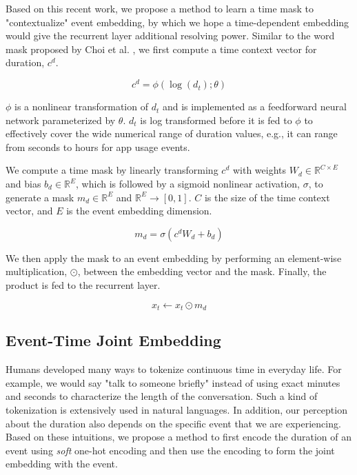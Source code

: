 \documentclass{article} %
\begin{document}
Based on this recent work, we propose a method to learn a time mask to "contextualize" event embedding, by which we hope a time-dependent embedding would give the recurrent layer additional resolving power. Similar to the word mask proposed by Choi et al. \citep{DBLP:journals/corr/ChoiCB16}, we first compute a time context vector for duration, $c^d$. 

\begin{equation}
    c^d=\phi(\log(d_t); \theta)
\end{equation}

$\phi$ is a nonlinear transformation of $d_t$ and is implemented as a feedforward neural network parameterized by $\theta$. $d_t$ is log transformed before it is fed to $\phi$ to effectively cover the wide numerical range of duration values, e.g., it can range from seconds to hours for app usage events.

We compute a time mask by linearly transforming $c^d$ with weights $W_d\in{\mathbb{R}^{C\times{E}}}$ and bias $b_d\in{\mathbb{R}^E}$, which is followed by a sigmoid nonlinear activation, $\sigma$, to generate a mask $m_d\in{\mathbb{R}^E}$ and $\mathbb{R}^E\rightarrow[0,1]$. $C$ is the size of the time context vector, and $E$ is the event embedding dimension.

\begin{equation}
    \label{mask}
    m_d=\sigma(c^dW_d+b_d)
\end{equation}

We then apply the mask to an event embedding by performing an element-wise multiplication, $\odot$, between the embedding vector and the mask. Finally, the product is fed to the recurrent layer.

\begin{equation}
    x_t\leftarrow{x_t\odot{m_d}}
\end{equation}

\subsection{Event-Time Joint Embedding}

Humans developed many ways to tokenize continuous time in everyday life. For example, we would say "talk to someone briefly" instead of using exact minutes and seconds to characterize the length of the conversation. Such a kind of tokenization is extensively used in natural languages. In addition, our perception about the duration also depends on the specific event that we are experiencing. Based on these intuitions, we propose a method to first encode the duration of an event using \emph{soft} one-hot encoding and then use the encoding to form the joint embedding with the event. 
\end{document}

